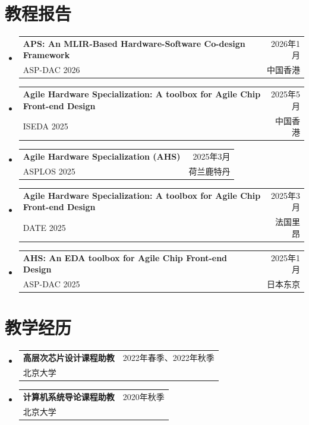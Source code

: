 \documentclass[letterpaper,11pt]{article}
\makeatletter
\newcommand{\CVSubheading}[4]{
  \vspace{-2pt}\item
    \begin{tabular*}{0.97\textwidth}[t]{l@{\extracolsep{\fill}}r}
      \textbf{#1} & #2 \\
      \small#3 & \small #4 \\
    \end{tabular*}\vspace{-7pt}
}
\newcommand{\CVSubHeadingListStart}{\begin{itemize}[leftmargin=0.5cm, label={}]}
\newcommand{\CVSubHeadingListEnd}{\end{itemize}}
\makeatother
\begin{document}
\section{教程报告}
  \CVSubHeadingListStart
    \CVSubheading
      {APS: An MLIR-Based Hardware-Software Co-design Framework}{2026年1月}
      {ASP-DAC 2026}{中国香港}
    \CVSubheading
      {Agile Hardware Specialization: A toolbox for Agile Chip Front-end Design}{2025年5月}
      {ISEDA 2025}{中国香港}
    \CVSubheading
      {Agile Hardware Specialization (AHS)}{2025年3月}
      {ASPLOS 2025}{荷兰鹿特丹}
    \CVSubheading
      {Agile Hardware Specialization: A toolbox for Agile Chip Front-end Design}{2025年3月}
      {DATE 2025}{法国里昂}
    \CVSubheading
      {AHS: An EDA toolbox for Agile Chip Front-end Design}{2025年1月}
      {ASP-DAC 2025}{日本东京}
  \CVSubHeadingListEnd

\section{教学经历}
  \CVSubHeadingListStart
    \CVSubheading
      {高层次芯片设计课程助教}{2022年春季、2022年秋季}
      {北京大学}{}
    \CVSubheading
      {计算机系统导论课程助教}{2020年秋季}
      {北京大学}{}
  \CVSubHeadingListEnd
\end{document}
